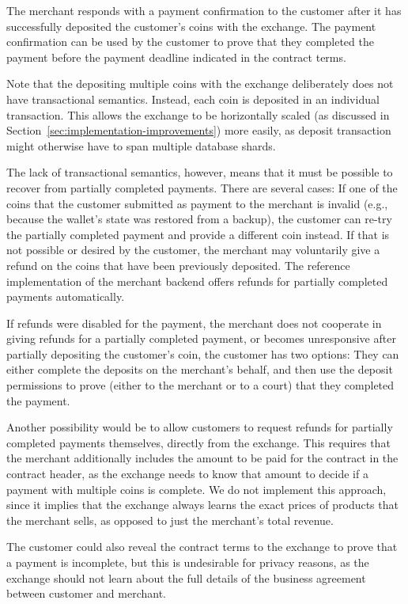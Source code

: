The merchant responds with a payment confirmation to the customer after it has
successfully deposited the customer's coins with the exchange.  The payment
confirmation can be used by the customer to prove that they completed the
payment before the payment deadline indicated in the contract terms.

Note that the depositing multiple coins with the exchange deliberately does not
have transactional semantics.  Instead, each coin is deposited in an individual
transaction.  This allows the exchange to be horizontally scaled (as discussed
in Section~\ref{sec:implementation-improvements}) more easily, as deposit
transaction might otherwise have to span multiple database shards.

The lack of transactional semantics, however, means that it must be possible to
recover from partially completed payments.  There are several cases: If one of
the coins that the customer submitted as payment to the merchant is invalid
(e.g., because the wallet's state was restored from a backup), the customer can
re-try the partially completed payment and provide a different coin instead.
If that is not possible or desired by the customer, the merchant may voluntarily give a
refund on the coins that have been previously deposited.  The reference
implementation of the merchant backend offers refunds for partially completed
payments automatically.

If refunds were disabled for the payment, the merchant does not cooperate in
giving refunds for a partially completed payment, or becomes unresponsive after
partially depositing the customer's coin, the customer has two options: They
can either complete the deposits on the merchant's behalf, and then use the
deposit permissions to prove (either to the merchant or to a court) that they
completed the payment.

Another possibility would be to allow customers to request refunds for partially
completed payments themselves, directly from the exchange.
This requires that the merchant additionally
includes the amount to be paid for the contract in the contract header, as the
exchange needs to know that amount to decide if a payment with multiple coins
is complete.  We do not implement this approach, since it implies that the
exchange always learns the exact prices of products that the merchant sells, as
opposed to just the merchant's total revenue.

The customer could also reveal the contract terms to the exchange to prove that
a payment is incomplete, but this is undesirable for privacy reasons, as the
exchange should not learn about the full details of the business agreement
between customer and merchant.

